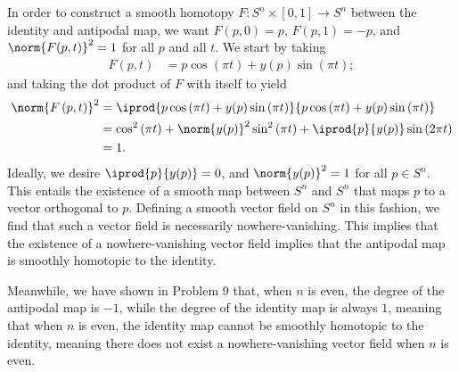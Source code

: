 \documentclass[10pt]{mypackage}
\begin{document}
\begin{solution}
  In order to construct a smooth homotopy $F\colon S^{n}\times [0,1]\rightarrow S^{n}$ between the identity and antipodal map, we want $F\left( p,0 \right) = p$, $F\left( p,1 \right) = -p$, and $ \norm{F(p,t)}^2 = 1 $ for all $p$ and all $t$. We start by taking
  \begin{align*}
    F\left( p,t \right) &= p\cos\left( \pi t \right) + y(p)\sin\left( \pi t \right);
  \end{align*}
  and taking the dot product of $F$ with itself to yield
  \begin{align*}
    \norm{F\left( p,t \right)}^2 &= \iprod{p\cos\left( \pi t \right) + y(p)\sin\left( \pi t \right)}{ p\cos\left( \pi t \right) + y(p)\sin\left( \pi t \right) }\\
                                 &= \cos^2\left( \pi t \right) + \norm{y(p)}^2\sin^2\left( \pi t \right) + \iprod{p}{y(p)} \sin\left( 2\pi t \right)\\
                                 &= 1.
  \end{align*}
  Ideally, we desire $ \iprod{p}{y(p)} = 0 $, and $ \norm{y(p)}^2 = 1 $ for all $p\in S^{n}$. This entails the existence of a smooth map between $S^{n}$ and $S^{n}$ that maps $p$ to a vector orthogonal to $p$. Defining a smooth vector field on $S^{n}$ in this fashion, we find that such a vector field is necessarily nowhere-vanishing. This implies that the existence of a nowhere-vanishing vector field implies that the antipodal map is smoothly homotopic to the identity.\newline

  Meanwhile, we have shown in Problem 9 that, when $n$ is even, the degree of the antipodal map is $-1$, while the degree of the identity map is always $1$, meaning that when $n$ is even, the identity map cannot be smoothly homotopic to the identity, meaning there does not exist a nowhere-vanishing vector field when $n$ is even.
\end{solution}
\end{document}
